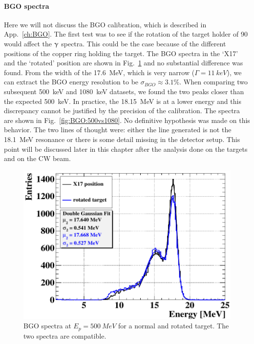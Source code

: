 \begin{refsection}
        \paragraph{BGO spectra}
        Here we will not discuss the BGO calibration, which is described in App.~\ref{ch:BGO}.
        The first test was to see if the rotation of the target holder of \SI{90}{\deg} would affect the $\upgamma$ spectra. 
        This could be the case because of the different positions of the copper ring holding the target.
        The BGO spectra in the `X17' and the `rotated' position are shown in Fig.~\ref{fig:BGO:rotated} and no substantial difference was found.
        From the width of the \SI{17.6}{MeV}, which is very narrow ($\Gamma=\SI{11}{keV}$), we can extract the BGO energy resolution to be $\sigma_{BGO} \approx 3.1\%$.
        When comparing two subsequent \SI{500}{keV} and \SI{1080}{keV} datasets, we found the two peaks closer than the expected \SI{500}{keV}.
        In practice, the \SI{18.15}{MeV} is at a lower energy and this discrepancy cannot be justified by the precision of the calibration.
        The spectra are shown in Fig.~\ref{fig:BGO:500vs1080}.
        No definitive hypothesis was made on this behavior.
        The two lines of thought were: either the line generated is not the \SI{18.1}{MeV} resonance or there is some detail missing in the detector setup.
        This point will be discussed later in this chapter after the analysis done on the targets and on the CW beam.
        
        \begin{figure}
            \centering
            \includegraphics[width=0.9\linewidth]{Figures//X17//BGO/BGO_rotated.png}
            \caption[X17: comparison of spectra from rotated BGO]{BGO spectra at $E_p=\SI{500}{MeV}$ for a normal and rotated target. The two spectra are compatible.}
            \label{fig:BGO:rotated}
        \end{figure}


\end{refsection}
